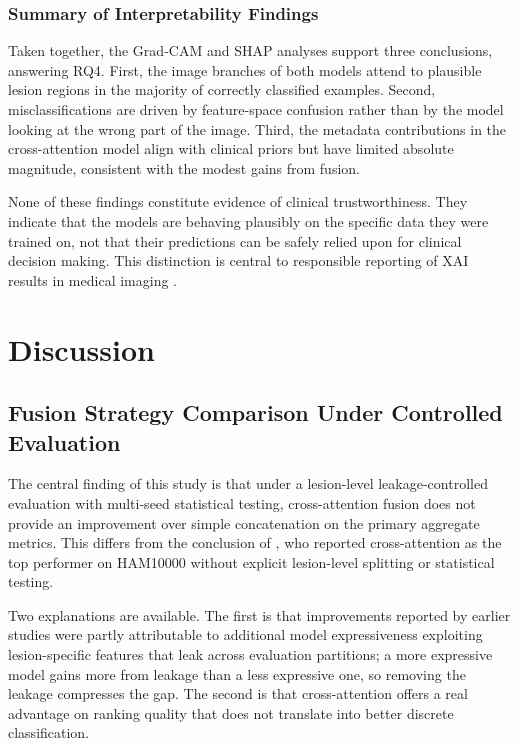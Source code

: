 \documentclass[conference]{IEEEtran}
\begin{document}
\subsubsection{Summary of Interpretability Findings}

Taken together, the Grad-CAM and SHAP analyses support three conclusions, answering RQ4. First, the image branches of both models attend to plausible lesion regions in the majority of correctly classified examples. Second, misclassifications are driven by feature-space confusion rather than by the model looking at the wrong part of the image. Third, the metadata contributions in the cross-attention model align with clinical priors but have limited absolute magnitude, consistent with the modest gains from fusion.

None of these findings constitute evidence of clinical trustworthiness. They indicate that the models are behaving plausibly on the specific data they were trained on, not that their predictions can be safely relied upon for clinical decision making. This distinction is central to responsible reporting of XAI results in medical imaging \citep{ghassemi2021false}.

\section{Discussion}
\label{sec:discussion}

\subsection{Fusion Strategy Comparison Under Controlled Evaluation}

The central finding of this study is that under a lesion-level leakage-controlled evaluation with multi-seed statistical testing, cross-attention fusion does not provide an improvement over simple concatenation on the primary aggregate metrics. This differs from the conclusion of \citet{das2025comparative}, who reported cross-attention as the top performer on HAM10000 without explicit lesion-level splitting or statistical testing.

Two explanations are available. The first is that improvements reported by earlier studies were partly attributable to additional model expressiveness exploiting lesion-specific features that leak across evaluation partitions; a more expressive model gains more from leakage than a less expressive one, so removing the leakage compresses the gap. The second is that cross-attention offers a real advantage on ranking quality that does not translate into better discrete classification.
\end{document}
